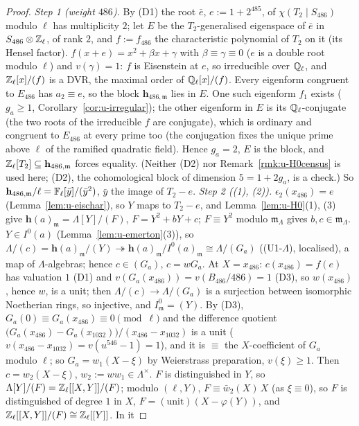 \documentclass[11pt]{article}
\newcommand{\Iw}{\Lambda}                         %
\newcommand{\hcusp}{\mathbf{h}}                   %
\newcommand{\ee}{\epsilon}                        %
\newcommand{\Zl}{\Z_\ell}
\newcommand{\Ql}{\Q_\ell}
\begin{document}
\begin{proof}
\emph{Step 1 (weight $486$).} By (D1) the root $\bar e$, $e:=1+2^{485}$, of $\chi(T_2\mid S_{486})$ modulo $\ell$ has multiplicity $2$; let $E$ be the $T_2$-generalised eigenspace
of $\bar e$ in $S_{486}\otimes\Zl$, of rank $2$, and $f:=f_{486}$ the characteristic polynomial of $T_2$ on it (its Hensel factor). $f(x+e)=x^{2}+\beta x+\gamma$ with $\beta\equiv\gamma\equiv0$
($e$ is a double root modulo $\ell$) and $v(\gamma)=1$: $f$ is Eisenstein at $e$, so irreducible over $\Ql$, and $\Zl[x]/(f)$ is a DVR, the maximal order of $\Ql[x]/(f)$.
Every eigenform congruent to $E_{486}$ has $a_2\equiv e$, so the block $\hcusp_{486,\mathfrak m}$ lies in $E$. One such eigenform $f_1$ exists ($g_a\ge1$, Corollary~\ref{cor:u-irregular}); the
other eigenform in $E$ is its $\Ql$-conjugate (the two roots of the irreducible $f$ are conjugate), which is ordinary and congruent to $E_{486}$ at every prime too (the conjugation fixes
the unique prime above $\ell$ of the ramified quadratic field). Hence $g_a=2$, $E$ is the block, and $\Zl[T_2]\subseteq\hcusp_{486,\mathfrak m}$ forces equality. (Neither (D2) nor
Remark~\ref{rmk:u-H0census} is used here; (D2), the cohomological block of dimension $5=1+2g_a$, is a check.) So $\hcusp_{486,\mathfrak m}/\ell=\Fl[\bar y]/(\bar y^{2})$, $\bar y$ the image of $T_2-e$.
\emph{Step 2 ((1), (2)).} $\ee_2(x_{486})=e$ (Lemma~\ref{lem:u-eischar}), so $Y$ maps to $T_2-e$, and Lemma~\ref{lem:u-H0}(1), (3) give $\hcusp(a)_{\mathfrak m}=\Iw[Y]/(F)$,
$F=Y^{2}+bY+c$; $F\equiv Y^{2}$ modulo $\mathfrak m_\Iw$ gives $b,c\in\mathfrak m_\Iw$. $Y\in I^{0}(a)$ (Lemma~\ref{lem:u-emerton}(3)), so
$\Iw/(c)=\hcusp(a)_{\mathfrak m}/(Y)\twoheadrightarrow\hcusp(a)_{\mathfrak m}/I^{0}(a)_{\mathfrak m}\cong\Iw/(G_a)$ ((U1-$\Iw$), localised), a map of $\Iw$-algebras; hence $c\in(G_a)$,
$c=wG_a$. At $X=x_{486}$: $c(x_{486})=f(e)$ has valuation $1$ (D1) and $v(G_a(x_{486}))=v(B_{486}/486)=1$ (D3), so $w(x_{486})$, hence $w$, is a unit; then $\Iw/(c)\to\Iw/(G_a)$ is a
surjection between isomorphic Noetherian rings, so injective, and $I^{0}_{\mathfrak m}=(Y)$. By (D3), $G_a(0)\equiv G_a(x_{486})\equiv0\pmod\ell$ and the difference quotient
$\bigl(G_a(x_{486})-G_a(x_{1032})\bigr)/(x_{486}-x_{1032})$ is a unit ($v(x_{486}-x_{1032})=v(u^{546}-1)=1$), and it is $\equiv$ the $X$-coefficient of $G_a$ modulo $\ell$; so
$G_a=w_1(X-\xi)$ by Weierstrass preparation, $v(\xi)\ge1$. Then $c=w_2(X-\xi)$, $w_2:=ww_1\in\Iw^\times$. $F$ is distinguished in $Y$, so $\Iw[Y]/(F)=\Zl[[X,Y]]/(F)$; modulo $(\ell,Y)$,
$F\equiv\bar w_2(X)\,X$ (as $\xi\equiv0$), so $F$ is distinguished of degree $1$ in $X$, $F=(\text{unit})(X-\varphi(Y))$, and $\Zl[[X,Y]]/(F)\cong\Zl[[Y]]$. In it

\end{proof}
\end{document}
